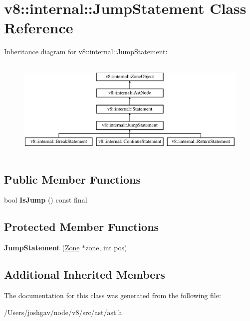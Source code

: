 \hypertarget{classv8_1_1internal_1_1_jump_statement}{}\section{v8\+:\+:internal\+:\+:Jump\+Statement Class Reference}
\label{classv8_1_1internal_1_1_jump_statement}
Inheritance diagram for v8\+:\+:internal\+:\+:Jump\+Statement\+:\begin{figure}[H]
\begin{center}
\leavevmode
\includegraphics[height=4.861111cm]{classv8_1_1internal_1_1_jump_statement}
\end{center}
\end{figure}
\subsection*{Public Member Functions}
\begin{DoxyCompactItemize}
\item 
bool {\bfseries Is\+Jump} () const  final\hypertarget{classv8_1_1internal_1_1_jump_statement_a86fe9dddd6c79ecda17e2cab271aa0c7}{}\label{classv8_1_1internal_1_1_jump_statement_a86fe9dddd6c79ecda17e2cab271aa0c7}

\end{DoxyCompactItemize}
\subsection*{Protected Member Functions}
\begin{DoxyCompactItemize}
\item 
{\bfseries Jump\+Statement} (\hyperlink{classv8_1_1internal_1_1_zone}{Zone} $\ast$zone, int pos)\hypertarget{classv8_1_1internal_1_1_jump_statement_af3cdf4deada148879280335ccd003190}{}\label{classv8_1_1internal_1_1_jump_statement_af3cdf4deada148879280335ccd003190}

\end{DoxyCompactItemize}
\subsection*{Additional Inherited Members}


The documentation for this class was generated from the following file\+:\begin{DoxyCompactItemize}
\item 
/\+Users/joshgav/node/v8/src/ast/ast.\+h\end{DoxyCompactItemize}
